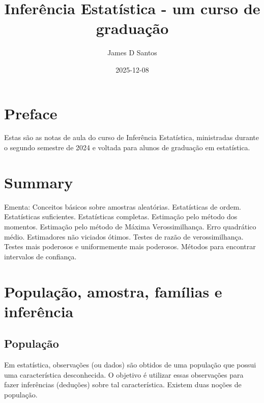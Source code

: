 \documentclass[
  letterpaper,
  DIV=11,
  numbers=noendperiod]{scrartcl}
\title{Inferência Estatística - um curso de graduação}
\author{James D Santos}
\date{2025-12-08}
\renewcommand*\contentsname{Table of contents}
\newcommand\contentsname{Table of contents}
\begin{document}
\maketitle

\renewcommand*\contentsname{Table of contents}
{
\hypersetup{linkcolor=}
\setcounter{tocdepth}{2}
\tableofcontents
}

\chapter*{Preface}\label{preface}


Estas são as notas de aula do curso de Inferência Estatística,
ministradas durante o segundo semestre de 2024 e voltada para alunos de
graduação em estatística.


\chapter{Summary}\label{summary}

Ementa: Conceitos básicos sobre amostras aleatórias. Estatísticas de
ordem. Estatísticas suficientes. Estatísticas completas. Estimação pelo
método dos momentos. Estimação pelo método de Máxima Verossimilhança.
Erro quadrático médio. Estimadores não viciados ótimos. Testes de razão
de verossimilhança. Testes mais poderosos e uniformemente mais
poderosos. Métodos para encontrar intervalos de confiança.


\chapter{População, amostra, famílias e
inferência}\label{populauxe7uxe3o-amostra-famuxedlias-e-inferuxeancia}

\section{População}\label{populauxe7uxe3o}

Em estatística, observações (ou dados) são obtidos de uma população que
possui uma característica desconhecida. O objetivo é utilizar essas
observações para fazer inferências (deduções) sobre tal característica.
Existem duas noções de população.
\end{document}
